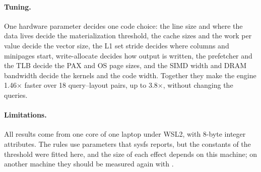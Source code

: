 \paragraph{Tuning.} One hardware parameter decides one code choice: the line size and where the
data lives decide the materialization threshold, the cache sizes and the work per value decide
the vector size, the L1 set stride decides where columns and minipages start, write-allocate
decides how output is written, the prefetcher and the TLB decide the PAX and OS page sizes, and
the SIMD width and DRAM bandwidth decide the kernels and the code width. Together they make the
engine 1.46$\times$ faster over 18 query--layout pairs, up to 3.8$\times$, without changing the
queries.

\paragraph{Limitations.} All results come from one core of one laptop under WSL2, with 8-byte
integer attributes. The rules use parameters that sysfs reports, but the constants of the
threshold were fitted here, and the size of each effect depends on this machine; on another
machine they should be measured again with .
